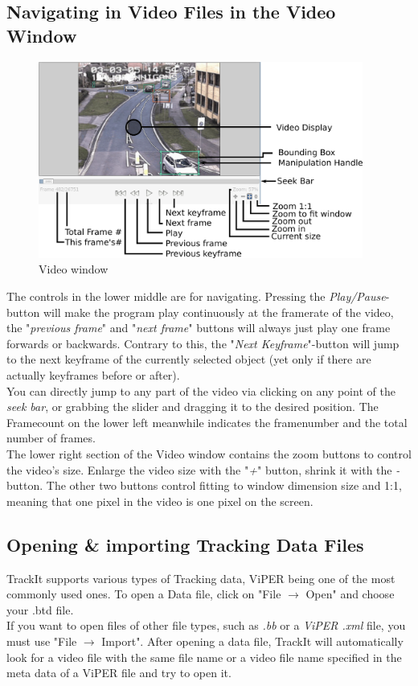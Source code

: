 \subsection{Navigating in Video Files in the Video Window}
\begin{figure}[t]
\centering
\includegraphics[angle=0,width=0.95\textwidth]{images/videowindow_final}
\caption{Video window}
\label{fig:videowindow}
\end{figure}
The controls in the lower middle are for navigating. 
Pressing the \emph{Play/Pause}-button will make the program play continuously at the framerate of the video, the "\emph{previous frame}" and "\emph{next frame}" buttons will always just play one frame forwards or backwards. Contrary to this, the "\emph{Next Keyframe}"-button will jump to the next keyframe of the currently selected object (yet only if there are actually keyframes before or after).\\
You can directly jump to any part of the video via clicking on any point of the \emph{seek bar}, or grabbing the slider and dragging it to the desired position. The Framecount on the lower left meanwhile indicates the framenumber and the total number of frames.\\
The lower right section of the Video window contains the zoom buttons to control the video's size. Enlarge the video size with the "\emph{+}" button, shrink it with the \emph{-} button. The other two buttons control fitting to window dimension size and 1:1, meaning that one pixel in the video is one pixel on the screen.

\subsection{Opening \& importing Tracking Data Files}
TrackIt supports various types of Tracking data, ViPER being one of the most commonly used ones. To open a Data file, click on "File $\rightarrow$ Open" and choose your .btd file.\\
If you want to open files of other file types, such as \emph{.bb} or a \emph{ViPER .xml} file, you must use "File $\rightarrow$ Import". After opening a data file, TrackIt will automatically look for a video file with the same file name or a video file name specified in the meta data of a ViPER file and try to open it. 


